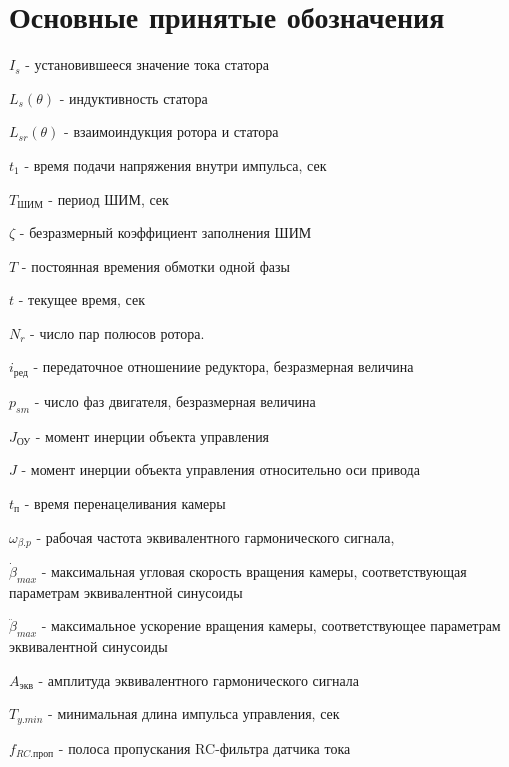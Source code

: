 \section{ Основные принятые обозначения }

$I_{s}$ - установившееся значение тока статора

$L_{s}(\theta)$ - индуктивность статора

$L_{sr}(\theta)$ - взаимоиндукция ротора и статора

$t_{1}$ - время подачи напряжения внутри импульса, сек

$T_\text{ШИМ}$ - период ШИМ, сек

$\zeta$ - безразмерный коэффициент заполнения ШИМ

$T$ - постоянная времения обмотки одной фазы

$t$ - текущее время, сек

$N_{r}$ - число пар полюсов ротора.

$i_\text{ред}$ - передаточное отношениие редуктора, безразмерная величина

$p_{sm}$ - число фаз двигателя, безразмерная величина

$J_{\text{ОУ}}$ - момент инерции объекта управления

$J$ - момент инерции объекта управления относительно оси привода

$t_\text{п}$ - время перенацеливания камеры

$\omega_{\beta.p}$ - рабочая частота эквивалентного гармонического сигнала,

$\dot{\beta}_{max}$ - максимальная угловая скорость вращения камеры, соответствующая параметрам эквивалентной синусоиды

$\ddot{\beta}_{max}$ - максимальное ускорение вращения камеры, соответствующее параметрам эквивалентной синусоиды

$A_\text{экв}$ - амплитуда эквивалентного гармонического сигнала

$T_{y.min}$ - минимальная длина импульса управления, сек

$f_{RC.\text{проп} }$ - полоса пропускания RC-фильтра датчика тока
